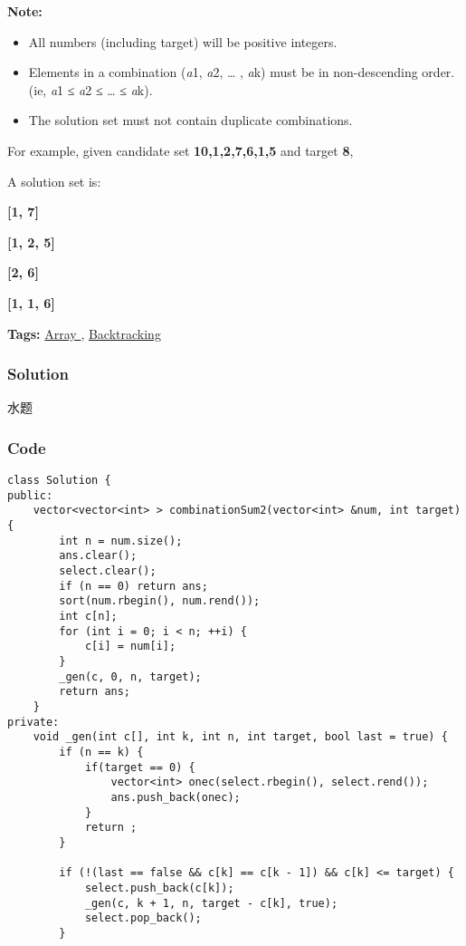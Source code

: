 \documentclass{article}
\begin{document}
\begin{CJK*}{UTF8}{gkai}
\textbf{Note:}



\begin{itemize}
\item All numbers (including target) will be positive integers.
\item Elements in a combination (\emph{a}1, \emph{a}2, … , \emph{a}k) must be in non-descending order. (ie, \emph{a}1 ≤ \emph{a}2 ≤ … ≤ \emph{a}k).
\item The solution set must not contain duplicate combinations.
\end{itemize}

For example, given candidate set \textbf{10,1,2,7,6,1,5} and target \textbf{8}, 


A solution set is: 


\textbf{[1, 7]} 


\textbf{[1, 2, 5]} 


\textbf{[2, 6]} 


\textbf{[1, 1, 6]}


\textbf{Tags: }
\hyperref[ Array ]{ Array },  \hyperref[ Backtracking ]{ Backtracking }



\subsubsection*{Solution}
水题

\subsubsection*{Code}
\begin{lstlisting}
class Solution {
public:
    vector<vector<int> > combinationSum2(vector<int> &num, int target) {
        int n = num.size();
        ans.clear();
        select.clear();
        if (n == 0) return ans;
        sort(num.rbegin(), num.rend());
        int c[n];
        for (int i = 0; i < n; ++i) {
            c[i] = num[i];
        }
        _gen(c, 0, n, target);
        return ans;
    }
private:
    void _gen(int c[], int k, int n, int target, bool last = true) {
        if (n == k) {
            if(target == 0) {
                vector<int> onec(select.rbegin(), select.rend());
                ans.push_back(onec);
            }
            return ;
        }
        
        if (!(last == false && c[k] == c[k - 1]) && c[k] <= target) {
            select.push_back(c[k]);
            _gen(c, k + 1, n, target - c[k], true);
            select.pop_back();
        }
        

\end{lstlisting}
\end{CJK*}
\end{document}
